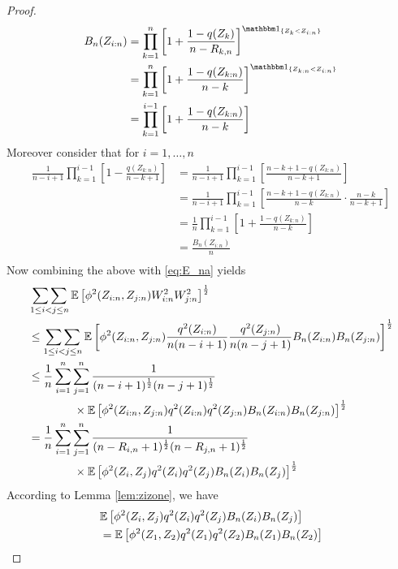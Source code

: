 \begin{lemma}
\begin{proof}
		\begin{align*}
		B_n(Z_{i:n}) &= \prod_{k=1}^{n}\left[1+\frac{1-q(Z_{k})}{n-R_{k,n}}\right]^{\I{Z_{k} < Z_{i:n}}}\\
		&= \prod_{k=1}^{n}\left[1+\frac{1-q(Z_{k:n})}{n-k}\right]^{\I{Z_{k:n} < Z_{i:n}}}\\
		&=  \prod_{k=1}^{i-1}\left[1+\frac{1-q(Z_{k:n})}{n-k}\right]
		\end{align*}
		Moreover consider that for $i=1,\dots,n$
		\begin{align*}
		\frac{1}{n-i+1}\prod_{k=1}^{i-1}\left[1-\frac{q(Z_{k:n})}{n-k+1}\right]
		&=  \frac{1}{n-i+1}\prod_{k=1}^{i-1}\left[\frac{n-k+1-q(Z_{k:n})}{n-k+1}\right] \\
		&=  \frac{1}{n-i+1}\prod_{k=1}^{i-1}\left[\frac{n-k+1-q(Z_{k:n})}{n-k} \cdot \frac{n-k}{n-k+1}\right]\\
		&=  \frac{1}{n}\prod_{k=1}^{i-1}\left[1+\frac{1-q(Z_{k:n})}{n-k}\right]\\
		&=  \frac{B_n(Z_{i:n})}{n}\\
		\end{align*}
		Now combining the above with \eqref{eq:E_na} yields 
		\begin{align*}
		&\mathop{\sum\sum}\limits_{1\leq i<j\leq n}\mathbb{E}\left[\phi^2(Z_{i:n}, Z_{j:n}) W^2_{i:n} W^2_{j:n}\right]^{\frac{1}{2}}\\
		&\leq \mathop{\sum\sum}\limits_{1\leq i<j\leq n}\mathbb{E}\left[\phi^2(Z_{i:n}, Z_{j:n}) \frac{q^2(Z_{i:n})}{n(n-i+1)}\frac{q^2(Z_{j:n})}{n(n-j+1)} B_n(Z_{i:n})B_n(Z_{j:n})\right]^\frac{1}{2}\\
		&\leq \frac{1}{n}\sum_{i=1}^{n}\sum_{j=1}^{n}\frac{1}{(n-i+1)^\frac{1}{2}(n-j+1)^\frac{1}{2}}\\
		&\qquad\qquad\times \mathbb{E}\left[\phi^2(Z_{i:n}, Z_{j:n}) q^2(Z_{i:n})q^2(Z_{j:n}) B_n(Z_{i:n})B_n(Z_{j:n})\right]^\frac{1}{2}\\
		&= \frac{1}{n}\sum_{i=1}^{n}\sum_{j=1}^{n} \frac{1}{(n-R_{i,n}+1)^{\frac{1}{2}} (n-R_{j,n}+1)^{\frac{1}{2}}}\\
		&\qquad\qquad \times \mathbb{E}\left[\phi^2(Z_{i}, Z_{j}) q^2(Z_{i})q^2(Z_{j})B_n(Z_{i})B_n(Z_{j})\right]^{\frac{1}{2}}
		\end{align*}
		According to Lemma \ref{lem:zizone}, we have
		\begin{align*}
		&\mathbb{E}\left[\phi^2(Z_{i}, Z_{j}) q^2(Z_{i})q^2(Z_{j})B_n(Z_{i})B_n(Z_{j})\right]\\
		&= \mathbb{E}\left[\phi^2(Z_{1}, Z_{2}) q^2(Z_{1})q^2(Z_{2})B_n(Z_{1})B_n(Z_{2})\right]
		\end{align*}

\end{proof}
\end{lemma}
